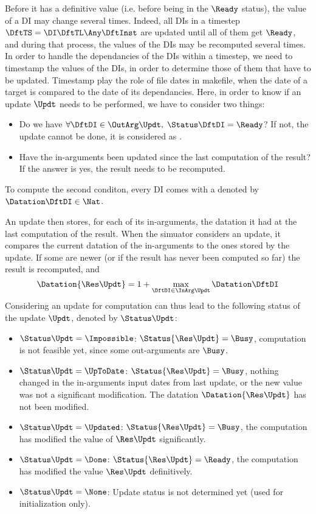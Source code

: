 Before it has a definitive value (i.e. before being in the $\Ready$ status), the value of a DI may change several times. Indeed, all DIs in a timestep $\DftTS = \DI\DftTL\Any\DftInst$ are updated until all of them get $\Ready$, and during that process, the values of the DIs may be recomputed several times. In order to handle the dependancies of the DIs within a timestep, we need to timestamp the values of the DIs, in order to determine those of them that have to be updated. Timestamp play the role of file dates in makefile, when the date of a target is compared to the date of its dependancies. Here, in order to know if an update $\Updt$ needs to be performed, we have to consider two things:
\begin{itemize}
\item Do we have $\forall \DftDI \in \OutArg\Updt,\; \Status\DftDI = \Ready$? If not, the update cannot be done, it is considered as .
\item Have the in-arguments been updated since the last computation of the result? If the answer is yes, the result needs to be recomputed.
\end{itemize}

To compute the second conditon, every DI comes with a  denoted by $\Datation\DftDI \in \Nat$.

An update then stores, for each of its in-arguments, the datation it had at the last computation of the result. When the simuator considers an update, it compares the current datation of the in-arguments to the ones stored by the update. If some are newer (or if the result has never been computed so far) the result is recomputed, and
\begin{equation}
  \Datation{\Res\Updt} = 1 + \max_{\DftDI \in \InArg\Updt}\Datation\DftDI
\end{equation}
Considering an update for computation can thus lead to the following status of the update $\Updt$, denoted by $\Status\Updt$:
\begin{itemize}
\item $\Status\Updt=\Impossible$: $\Status{\Res\Updt}=\Busy$, computation is not feasible yet, since some out-arguments are $\Busy$.
\item $\Status\Updt=\UpToDate$:  $\Status{\Res\Updt}=\Busy$, nothing changed in the in-arguments input dates from last update, or the new value was not a significant modification. The datation $\Datation{\Res\Updt}$ has not been modified.
\item $\Status\Updt=\Updated$:   $\Status{\Res\Updt}=\Busy$, the computation has modified the value of $\Res\Updt$ significantly.
\item $\Status\Updt=\Done$:      $\Status{\Res\Updt}=\Ready$, the computation has modified the value $\Res\Updt$ definitively.
\item $\Status\Updt=\None$:      Update status is not determined yet (used for initialization only).
\end{itemize}

